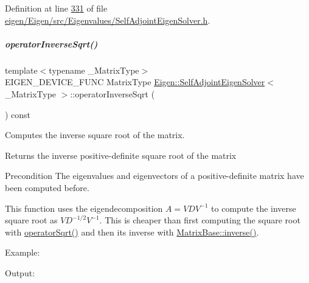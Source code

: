 Definition at line \hyperlink{eigen_2_eigen_2src_2_eigenvalues_2_self_adjoint_eigen_solver_8h_source_l00331}{331} of file \hyperlink{eigen_2_eigen_2src_2_eigenvalues_2_self_adjoint_eigen_solver_8h_source}{eigen/\+Eigen/src/\+Eigenvalues/\+Self\+Adjoint\+Eigen\+Solver.\+h}.

\mbox{\label{group___eigenvalues___module_a71fe0aea0b22d176efcea556c5c160f5}} 
\subparagraph{\texorpdfstring{operator\+Inverse\+Sqrt()}{operatorInverseSqrt()}\hspace{0.1cm}{\footnotesize\ttfamily [2/2]}}
{\footnotesize\ttfamily template$<$typename \+\_\+\+Matrix\+Type$>$ \\
E\+I\+G\+E\+N\+\_\+\+D\+E\+V\+I\+C\+E\+\_\+\+F\+U\+NC Matrix\+Type \hyperlink{group___eigenvalues___module_class_eigen_1_1_self_adjoint_eigen_solver}{Eigen\+::\+Self\+Adjoint\+Eigen\+Solver}$<$ \+\_\+\+Matrix\+Type $>$\+::operator\+Inverse\+Sqrt (\begin{DoxyParamCaption}{ }\end{DoxyParamCaption}) const\hspace{0.3cm}{\ttfamily [inline]}}



Computes the inverse square root of the matrix. 

\begin{DoxyReturn}{Returns}
the inverse positive-\/definite square root of the matrix
\end{DoxyReturn}
\begin{DoxyPrecond}{Precondition}
The eigenvalues and eigenvectors of a positive-\/definite matrix have been computed before.
\end{DoxyPrecond}
This function uses the eigendecomposition $ A = V D V^{-1} $ to compute the inverse square root as $ V D^{-1/2} V^{-1} $. This is cheaper than first computing the square root with \hyperlink{group___eigenvalues___module_a5c5158fd86366081bdabec38112c2c8a}{operator\+Sqrt()} and then its inverse with \hyperlink{group___core___module_a7712eb69e8ea3c8f7b8da1c44dbdeebf}{Matrix\+Base\+::inverse()}.

Example\+: 
\begin{DoxyCodeInclude}
\end{DoxyCodeInclude}
 Output\+: 
\begin{DoxyVerbInclude}
\end{DoxyVerbInclude}



